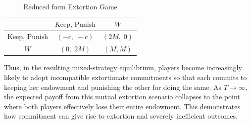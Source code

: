 \documentclass[main.tex]{subfiles}
\begin{document}
\begin{table}[h!]
    \centering
    \renewcommand{\arraystretch}{0.7}
    \begin{tabular}{c|cc}
                    & $\text{Keep, Punish}$ & $W$ \\ \hline
        $\text{Keep, Punish}$ & $(-c,\;-c)$      & $(2M,\;0)$ \\[2pt]
        $W$                       & $(0,\;2M)$       & $(M,M)$
    \end{tabular}
    \caption{Reduced form Extortion Game}
    \label{tab:commitment_reduced}
\end{table}
\newline
Thus, in the resulting mixed-strategy equilibrium, players become increasingly likely to adopt incompatible extortionate commitments so that each commits to keeping her endowment and punishing the other for doing the same. As $T\to\infty$, the expected payoff from this mutual extortion scenario collapses to the point where both players effectively lose their entire endowment. This demonstrates how commitment can give rise to extortion and severely inefficient outcomes.
 
\end{document}
